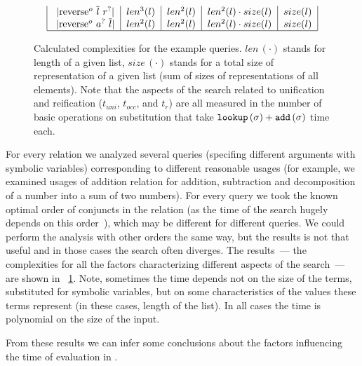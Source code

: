 \begin{figure}[t]
\[\begin{tabular}{|c|c|c|c|c|}
           \lstinline|reverse$^o$ $\overline{l}$ $r^?$| & $len^3(l)$ & $len^2(l)$ & $len^2(l) \cdot size(l)$ & $size(l)$  \\
           \lstinline|reverse$^o$ $a^?$ $\overline{l}$| & $len^2(l)$ & $len^2(l)$ & $len^2(l) \cdot size(l)$ & $size(l)$  \\
           \hline
      \end{tabular} \]
      \caption{Calculated complexities for the example queries. $len\,(\cdot)$ stands for length of a given list, $size\,(\cdot)$ stands for a total size of representation of a given
        list (sum of sizes of representations of all elements). Note that the aspects of the search related to unification and reification ($t_{uni}$, $t_{occ}$, and $t_r$) are all measured
        in the number of basic operations on substitution that take $\texttt{lookup}\,(\sigma) + \texttt{add}\,(\sigma)$ time each.}
  \label{fig:examples_all_complexities}
\end{figure}

For every relation we analyzed several queries (specifing different arguments with symbolic variables) corresponding to different reasonable usages (for example, we examined usages
of addition relation for addition, subtraction and decomposition of a number into a sum of two numbers). For every query we took the known optimal order of conjuncts in the relation
(as the time of the search hugely depends on this order~\cite{WillThesis}), which may be different for different queries. We could perform the analysis with other orders the same way,
but the results is not that useful and in those cases the search often diverges. The results~--- the complexities for all the factors characterizing different aspects of the search~---
are shown in \figureword~\ref{fig:examples_all_complexities}. Note, sometimes the time depends not on the size of the terms, substituted for symbolic variables, but on some
characteristics of the values these terms represent (in these cases, length of the list). In all cases the time is polynomial on the size of the input.

From these results we can infer some conclusions about the factors influencing the time of evaluation in \mK.

